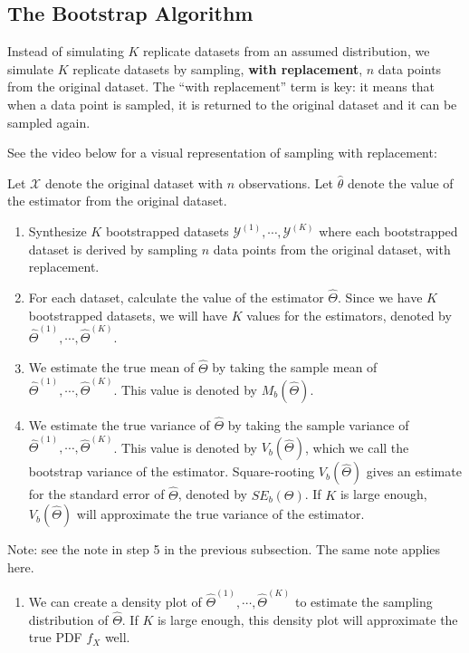 \documentclass[
]{book}
\providecommand{\tightlist}{%
  \setlength{\itemsep}{0pt}\setlength{\parskip}{0pt}}
\begin{document}
\subsection{The Bootstrap Algorithm}\label{the-bootstrap-algorithm}

Instead of simulating \(K\) replicate datasets from an assumed distribution, we simulate \(K\) replicate datasets by sampling, \textbf{with replacement}, \(n\) data points from the original dataset. The ``with replacement'' term is key: it means that when a data point is sampled, it is returned to the original dataset and it can be sampled again.

See the video below for a visual representation of sampling with replacement:

Let \(\mathcal{X}\) denote the original dataset with \(n\) observations. Let \(\hat{\theta}\) denote the value of the estimator from the original dataset.

\begin{enumerate}
\def\labelenumi{\arabic{enumi}.}
\item
  Synthesize \(K\) bootstrapped datasets \(\mathcal{Y}^{(1)}, \cdots, \mathcal{Y}^{(K)}\) where each bootstrapped dataset is derived by sampling \(n\) data points from the original dataset, with replacement.
\item
  For each dataset, calculate the value of the estimator \(\hat{\Theta}\). Since we have \(K\) bootstrapped datasets, we will have \(K\) values for the estimators, denoted by \(\hat{\Theta}^{(1)}, \cdots, \hat{\Theta}^{(K)}\).
\item
  We estimate the true mean of \(\hat{\Theta}\) by taking the sample mean of \(\hat{\Theta}^{(1)}, \cdots, \hat{\Theta}^{(K)}\). This value is denoted by \(M_b(\hat{\Theta})\).
\item
  We estimate the true variance of \(\hat{\Theta}\) by taking the sample variance of \(\hat{\Theta}^{(1)}, \cdots, \hat{\Theta}^{(K)}\). This value is denoted by \(V_b(\hat{\Theta})\), which we call the bootstrap variance of the estimator. Square-rooting \(V_b(\hat{\Theta})\) gives an estimate for the standard error of \(\hat{\Theta}\), denoted by \(SE_b(\Theta)\). If \(K\) is large enough, \(V_b(\hat{\Theta})\) will approximate the true variance of the estimator.
\end{enumerate}

Note: see the note in step 5 in the previous subsection. The same note applies here.

\begin{enumerate}
\def\labelenumi{\arabic{enumi}.}
\setcounter{enumi}{4}
\tightlist
\item
  We can create a density plot of \(\hat{\Theta}^{(1)}, \cdots, \hat{\Theta}^{(K)}\) to estimate the sampling distribution of \(\hat{\Theta}\). If \(K\) is large enough, this density plot will approximate the true PDF \(f_X\) well.
\end{enumerate}
\end{document}
